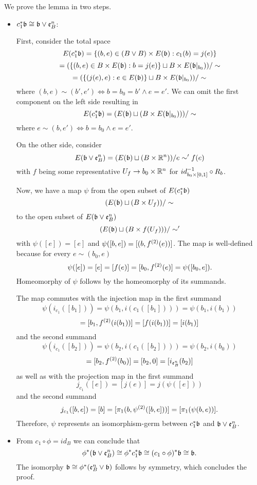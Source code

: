 \begin{myproof}
    We prove the lemma in two steps.
    \begin{itemize}
        \item $\ind{c_1}\bb \cong \bb \vee \be{B}$:
        
        First, consider the total space
        \[ E(\ind{c_1}\bb) = \set{(b, e) \in (B \vee B) \cross E(\bb)}{c_1(b) = j(e)} \]
        \[ = (\set{(b, e) \in B \cross E(\bb)}{b = j(e)} \sqcup B \cross E(\bb[b_0])) / \sim \]
        \[ = (\set{(j(e), e)}{e \in E(\bb)} \sqcup B \cross E(\bb[b_0])) / \sim \]
        where $(b, e) \sim (b', e') \iff b = b_0 = b' \land e = e'$.
        We can omit the first component on the left side resulting in
        \[ E(\ind{c_1}\bb) = (E(\bb) \sqcup (B \cross E(\bb[b_0]))) / \sim \]
        where $e \sim (b, e') \iff b = b_0 \land e = e'$.
        
        On the other side, consider
        \[ E(\bb \vee \be{B}) = (E(\bb) \sqcup (B \cross \R^n)) / e \sim' f(e) \]
        with $f$ being some representative
        $U_f \to b_0 \times \mathbb{R}^n$ for $id_{b_0 \times{} [0, 1]}^{-1} \circ R_b$.
        
        Now, we have a map $\psi$ from the open subset of $E(\ind{c_1}\bb)$
        \[ (E(\bb) \sqcup (B \cross U_f)) / \sim \]
        to the open subset of $E(\bb \vee \be{B})$
        \[ (E(\bb) \sqcup (B \cross f(U_f))) / \sim' \]
        with $\psi([e]) = [e]$ and $\psi([b, e]) = [(b, f^{(2)}(e))]$.
        The map is well-defined because for every $e \sim (b_0, e)$
        \[ \psi([e]) = [e] = [f(e)] = [b_0, f^{(2)}(e)] = \psi([b_0, e]). \]
        Homeomorphy of $\psi$ follows by the homeomorphy of its summands.
        
        The map commutes with the injection map in the first summand
        \[ \psi(i_{c_1}([b_1])) = \psi(b_1, i(c_1([b_1]))) = \psi(b_1, i(b_1)) \]
        \[ = [b_1, f^{(2)}(i(b_1))] = [f(i(b_1))] = [i(b_1)] \]
        and the second summand
        \[ \psi(i_{c_1}([b_2])) = \psi(b_2, i(c_1([b_2]))) = \psi(b_2, i(b_0)) \]
        \[ = [b_2, f^{(2)}(b_0)] = [b_2, 0] = [i_{\mathfrak{e}^{n}_{B}}(b_2)] \]
        as well as with the projection map in the first summand
        \[ j_{c_1}([e]) = [j(e)] = j(\psi([e])) \]
        and the second summand
        \[ j_{c_1}([b, e]) = [b] = [\pi_1(b, \psi^{(2)}([b, e]))] = [\pi_1(\psi(b, e))]. \]
        Therefore, $\psi$ represents an isomorphism-germ between $\ind{c_1}\bb$ and $\bb \vee \be{B}$.
    
        \item From $c_1 \circ \phi = id_B$ we can conclude that
        \[ \ind{\phi}(\bb \vee \be{B}) \cong \ind{\phi}\ind{c_1}\bb \cong \ind{(c_1 \circ \phi)}\bb \cong \bb. \]
        The isomorphy $\bb \cong \ind{\phi}(\be{B} \vee \bb)$ follows by symmetry,
        which concludes the proof.
    \end{itemize}
\end{myproof}

